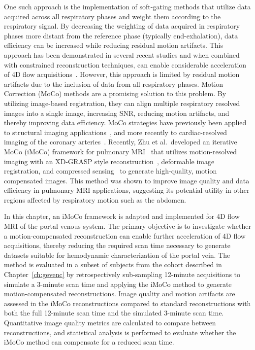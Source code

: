 One such approach is the implementation of soft-gating methods that utilize data acquired across all respiratory phases and weight them according to the respiratory signal. By decreasing the weighting of data acquired in respiratory phases more distant from the reference phase (typically end-exhalation), data efficiency can be increased while reducing residual motion artifacts. This approach has been demonstrated in several recent studies and when combined with constrained reconstruction techniques, can enable considerable acceleration of 4D flow acquisitions~\cite{jiangMotionRobustHigh2018,chengComprehensiveMotioncompensatedHighly2016, pruittFullySelfgatedWholeheart2021}. However, this approach is limited by residual motion artifacts due to the inclusion of data from all respiratory phases. Motion Correction (MoCo) methods are a promising solution to this problem. By utilizing image-based registration, they can align multiple respiratory resolved images into a single image, increasing SNR, reducing motion artifacts, and thereby improving data efficiency. MoCo strategies have previously been applied to structural imaging applications~\cite{cruzAcceleratedMotionCorrected2016, tanMotionCompensatedLowRankReconstruction2023}, and more recently to cardiac-resolved imaging of the coronary arteries~\cite{prietoHighlyEfficientRespiratory2015,pangHighEfficiencyCoronary2016}. Recently, Zhu et al.\ developed an iterative MoCo (iMoCo) framework for pulmonary MRI~\cite{zhuIterativeMotioncompensationReconstruction2020} that utilizes motion-resolved imaging with an XD-GRASP style reconstruction~\cite{fengXDGRASPGoldenangleRadial2016}, deformable image registration, and compressed sensing~\cite{lustigSparseMRIApplication2007} to generate high-quality, motion compensated images. This method was shown to improve image quality and data efficiency in pulmonary MRI applications, suggesting its potential utility in other regions affected by respiratory motion such as the abdomen.

In this chapter, an iMoCo framework is adapted and implemented for 4D flow MRI of the portal venous system. The primary objective is to investigate whether a motion-compensated reconstruction can enable further acceleration of 4D flow acquisitions, thereby reducing the required scan time necessary to generate datasets suitable for hemodynamic characterization of the portal vein. The method is evaluated in a subset of subjects from the cohort described in Chapter~\ref{ch:gevenc} by retrospectively sub-sampling 12-minute acquisitions to simulate a 3-minute scan time and applying the iMoCo method to generate motion-compensated reconstructions. Image quality and motion artifacts are assessed in the iMoCo reconstructions compared to standard reconstructions with both the full 12-minute scan time and the simulated 3-minute scan time. Quantitative image quality metrics are calculated to compare between reconstructions, and statistical analysis is performed to evaluate whether the iMoCo method can compensate for a reduced scan time. 

